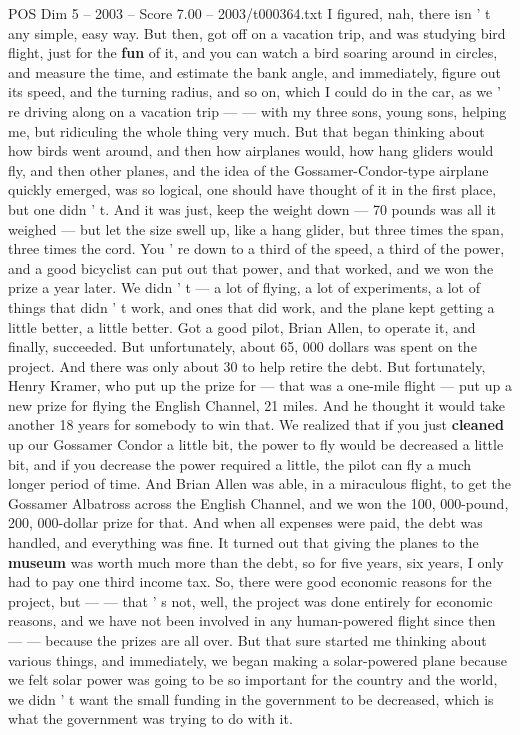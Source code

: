 \begin{textsample}{POS Dim 5 – 2003 – Score 7.00 – 2003/t000364.txt}
I figured, nah, there isn ' t any simple, easy way.
But then, got off on a vacation trip, and was studying bird flight, just for the \textbf{fun} of it, and you can watch a bird soaring around in circles, and measure the time, and estimate the bank angle, and immediately, figure out its speed, and the turning radius, and so on, which I could do in the car, as we ' re driving along on a vacation trip — — with my three sons, young sons, helping me, but ridiculing the whole thing very much.
But that began thinking about how birds went around, and then how airplanes would, how hang gliders would fly, and then other planes, and the idea of the Gossamer-Condor-type airplane quickly emerged, was so logical, one should have thought of it in the first place, but one didn ' t.
And it was just, keep the weight down — 70 pounds was all it weighed — but let the size swell up, like a hang glider, but three times the span, three times the cord.
You ' re down to a third of the speed, a third of the power, and a good bicyclist can put out that power, and that worked, and we won the prize a year later.
We didn ' t — a lot of flying, a lot of experiments, a lot of things that didn ' t work, and ones that did work, and the plane kept getting a little better, a little better.
Got a good pilot, Brian Allen, to operate it, and finally, succeeded.
But unfortunately, about 65, 000 dollars was spent on the project.
And there was only about 30 to help retire the debt.
But fortunately, Henry Kramer, who put up the prize for — that was a one-mile flight — put up a new prize for flying the English Channel, 21 miles.
And he thought it would take another 18 years for somebody to win that.
We realized that if you just \textbf{cleaned} up our Gossamer Condor a little bit, the power to fly would be decreased a little bit, and if you decrease the power required a little, the pilot can fly a much longer period of time.
And Brian Allen was able, in a miraculous flight, to get the Gossamer Albatross across the English Channel, and we won the 100, 000-pound, 200, 000-dollar prize for that.
And when all expenses were paid, the debt was handled, and everything was fine.
It turned out that giving the planes to the \textbf{museum} was worth much more than the debt, so for five years, six years, I only had to pay one third income tax.
So, there were good economic reasons for the project, but — — that ' s not, well, the project was done entirely for economic reasons, and we have not been involved in any human-powered flight since then — — because the prizes are all over.
But that sure started me thinking about various things, and immediately, we began making a solar-powered plane because we felt solar power was going to be so important for the country and the world, we didn ' t want the small funding in the government to be decreased, which is what the government was trying to do with it.

\end{textsample}
